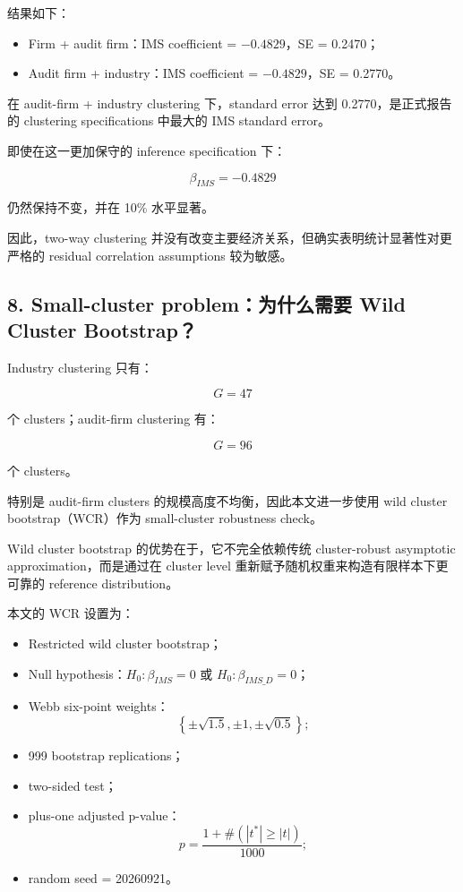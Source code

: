 \documentclass[11pt]{article}
\begin{document}
结果如下：

\begin{itemize}
    \item Firm + audit firm：IMS coefficient = $-0.4829$，SE = 0.2470；
    \item Audit firm + industry：IMS coefficient = $-0.4829$，SE = 0.2770。
\end{itemize}

在 audit-firm + industry clustering 下，standard error 达到 0.2770，是正式报告的 clustering specifications 中最大的 IMS standard error。

即使在这一更加保守的 inference specification 下：

\[
\beta_{IMS}=-0.4829
\]

仍然保持不变，并在 10\% 水平显著。

因此，two-way clustering 并没有改变主要经济关系，但确实表明统计显著性对更严格的 residual correlation assumptions 较为敏感。

\subsection{8. Small-cluster problem：为什么需要 Wild Cluster Bootstrap？}

Industry clustering 只有：

\[
G=47
\]

个 clusters；audit-firm clustering 有：

\[
G=96
\]

个 clusters。

特别是 audit-firm clusters 的规模高度不均衡，因此本文进一步使用 wild cluster bootstrap（WCR）作为 small-cluster robustness check。

Wild cluster bootstrap 的优势在于，它不完全依赖传统 cluster-robust asymptotic approximation，而是通过在 cluster level 重新赋予随机权重来构造有限样本下更可靠的 reference distribution。

本文的 WCR 设置为：

\begin{itemize}
    \item Restricted wild cluster bootstrap；
    \item Null hypothesis：$H_0:\beta_{IMS}=0$ 或 $H_0:\beta_{IMS\_D}=0$；
    \item Webb six-point weights：
    \[
    \left\{
    \pm\sqrt{1.5},
    \pm1,
    \pm\sqrt{0.5}
    \right\};
    \]
    \item 999 bootstrap replications；
    \item two-sided test；
    \item plus-one adjusted p-value：
    \[
    p=
    \frac{1+\#\left(|t^*|\geq |t|\right)}
    {1000};
    \]
    \item random seed = 20260921。
\end{itemize}
\end{document}
